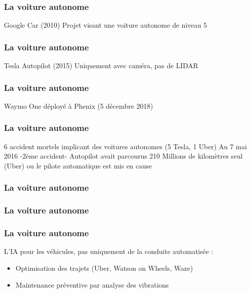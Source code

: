 \begin{frame}
  \frametitle{La voiture autonome}
  Google Car (2010)
  \newline
  Projet visant une voiture autonome de niveau 5
\end{frame}

\begin{frame}
  \frametitle{La voiture autonome}
  Tesla Autopilot (2015)
  \newline
  Uniquement avec caméra, pas de LIDAR
  \newline
\end{frame}

\begin{frame}
  \frametitle{La voiture autonome}
  Waymo One déployé à Phenix (5 décembre 2018)
\end{frame}

\begin{frame}
  \frametitle{La voiture autonome}
  6 accident mortels implicant des voitures autonomes (5 Tesla, 1 Uber)
  \newline
  Au 7 mai 2016 -2ème accident- Autopilot avait parcourus 210 Millions de kilomètres
   seul (Uber) ou le pilote automatique est mis en cause
\end{frame}

\begin{frame}
  \frametitle{La voiture autonome}
\end{frame}

\begin{frame}
  \frametitle{La voiture autonome}
\end{frame}

\begin{frame}
  \frametitle{La voiture autonome}
  L'IA pour les véhicules, pas uniquement de la conduite automatisée :
  \begin{itemize}
  \item Optimisation des trajets (Uber, Watson on Wheels, Waze)
  \item Maintenance préventive par analyse des vibrations
  \end{itemize}
\end{frame}

